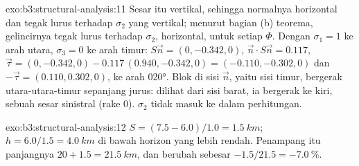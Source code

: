 \begin{solution}{exo:b3:structural-analysis:11}
Sesar itu vertikal, sehingga normalnya horizontal dan tegak lurus terhadap
$\sigma_2$ yang vertikal; menurut bagian (b) teorema, gelincirnya tegak lurus terhadap
$\sigma_2$, horizontal, untuk setiap $\Phi$. Dengan $\sigma_1 = 1$ ke arah utara,
$\sigma_3 = 0$ ke arah timur: $S\vec n = (0, -0.342, 0)$, $\vec n\cdot S\vec n =
0.117$, $\vec\tau = (0, -0.342, 0) - 0.117\,(0.940, -0.342, 0) = (-0.110,
-0.302, 0)$ dan $-\vec\tau = (0.110, 0.302, 0)$, ke arah \ang{020}. Blok
di sisi $\vec n$, yaitu sisi timur, bergerak utara-utara-timur sepanjang
jurus: dilihat dari sisi barat, ia bergerak ke kiri, sebuah sesar sinistral (rake
0). $\sigma_2$ tidak masuk ke dalam perhitungan.
\end{solution}

\begin{solution}{exo:b3:structural-analysis:12}
$S = (7.5 - 6.0)/1.0 = \qty{1.5}{km}$; $h = 6.0/1.5 = \qty{4.0}{km}$ di bawah
horizon yang lebih rendah. Penampang itu panjangnya $20 + 1.5 = \qty{21.5}{km}$, dan berubah
sebesar $-1.5/21.5 = \qty{-7.0}{\percent}$.
\end{solution}

